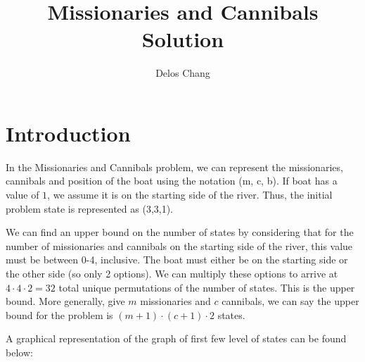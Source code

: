 \documentclass[a4paper]{report}
\title{Missionaries and Cannibals Solution}
\author{Delos Chang}
\begin{document}
\maketitle

\section{Introduction}

In the Missionaries and Cannibals problem, we can represent the missionaries, cannibals and position of the boat 
using the notation (m, c, b). If boat has a value of $1$, we assume it is on the starting side of the river. Thus, 
the initial problem state is represented as (3,3,1). 

We can find an upper bound on the number of states by considering that for the number of missionaries and cannibals
on the starting side of the river, this value must be between 0-4, inclusive. The boat must either be on the starting
side or the other side (so only 2 options). We can multiply these options to arrive at $4 \cdot 4 \cdot 2 = 32$ total
unique permutations of the number of states. This is the upper bound. More generally, give $m$ missionaries and $c$
cannibals, we can say the upper bound for the problem is $(m+1) \cdot (c+1) \cdot 2$ states. 

A graphical representation of the graph of first few level of states can be found below: 
\end{document}
